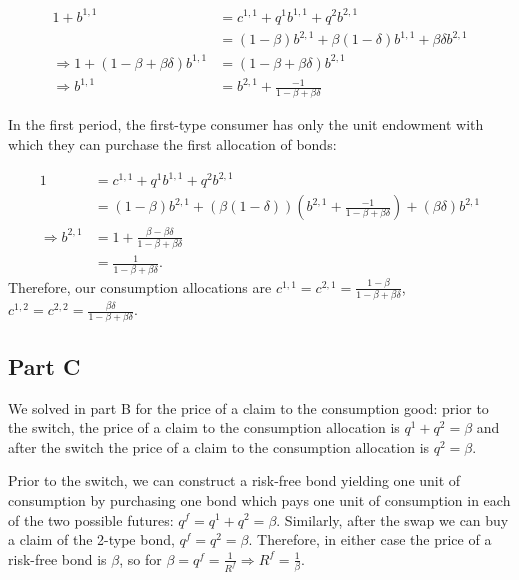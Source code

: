 \documentclass[11pt]{article} %
\begin{document}
\begin{align*}
1+b^{1,1}&= c^{1,1} + q^1b^{1,1} + q^2b^{2,1}\\
&=  (1-\beta)b^{2,1} + \beta(1-\delta)b^{1,1} +  \beta \delta b^{2,1} \\
\Rightarrow 1+(1-\beta + \beta \delta)b^{1,1} &= (1-\beta+\beta\delta)b^{2,1}\\
\Rightarrow b^{1,1}  &=  b^{2,1}+\frac{-1}{1-\beta + \beta \delta}
\end{align*}


In the first period, the first-type consumer has only the unit endowment with which they can purchase the first allocation of bonds:

\begin{align*}
1 &= c^{1,1} + q^1b^{1,1} + q^2b^{2,1}\\
 &= (1-\beta)b^{2,1} + ( \beta(1-\delta))\left( b^{2,1}+\frac{-1}{1-\beta + \beta \delta}\right) + (\beta\delta)b^{2,1}\\
\Rightarrow  b^{2,1} &= 1 + \frac{\beta - \beta\delta}{1-\beta + \beta\delta}\\
&= \frac{1}{1-\beta + \beta\delta}. 
\end{align*}
Therefore, our consumption allocations are $c^{1,1} = c^{2,1} = \frac{1-\beta}{1-\beta + \beta\delta}$, $c^{1,2} = c^{2,2} = \frac{\beta\delta}{1-\beta + \beta\delta}.$
\subsection{Part C}

We solved in part B for the price of a claim to the consumption good: prior to the switch, the price of a claim to the consumption allocation is  $q^1+q^2 = \beta $ and after the switch the price of a claim to the consumption allocation is $q^2 = \beta$.

Prior to the switch, we can construct a risk-free bond yielding one unit of consumption by purchasing one bond which pays one unit of consumption in each of the two possible futures: $q^f = q^1 + q^2 = \beta$. Similarly, after the swap we can buy a claim of the 2-type bond, $q^f = q^2 = \beta$. Therefore, in either case the price of a risk-free bond is $\beta$, so for $\beta = q^f = \frac{1}{R^f} \Rightarrow R^f = \frac{1}{\beta} $.
\end{document}
